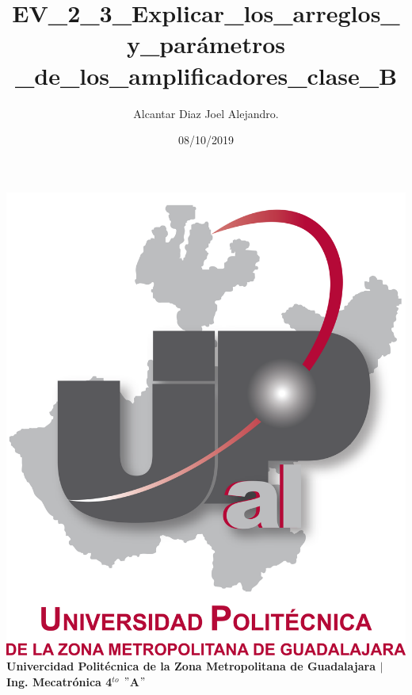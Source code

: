 \documentclass[letterpaper]{article}
\title{EV\_2\_3\_Explicar\_los\_arreglos\_y\_parámetros\\\_de\_los\_amplificadores\_clase\_B}
\author{Alcantar Diaz Joel Alejandro.}
\date{08/10/2019}
\begin{document}
    \maketitle
    \begin{center}
        \includegraphics[scale=0.5]{IMG/UPZMGlog.png}\\
        \vspace{2cm}
    \textbf{Univercidad Politécnica de la Zona Metropolitana de Guadalajara $|$ Ing. Mecatrónica 4$^{to}$ $"$A$"$}
    \end{center}
    \newpage
\end{document}
